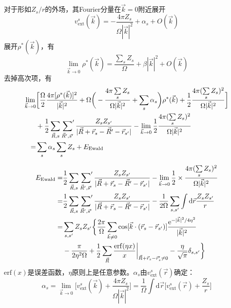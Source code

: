 对于形如$Z_s/r$的外场，其\textrm{Fourier}分量在$\vec k=0$附近展开
	\begin{equation}
		v_{\mathrm{ext}}^s(\vec k)=-\dfrac{4\pi Z_s}{\Omega|\vec k|^2}+\alpha_s+O(\vec k)
	\end{equation}
	展开$\rho^{\ast}(\vec k)$，有
	\begin{equation}
		\lim_{\vec k\rightarrow 0}\rho^{\ast}(\vec k)=\dfrac{\sum_sZ_s}{\Omega}+\beta|\vec k|^2+O(\vec k)
	\end{equation}
去掉高次项，有
\begin{equation}
	\begin{aligned}
		\lim_{\vec k\rightarrow 0}&\bigg[\dfrac{\Omega}2\dfrac{4\pi[\rho^{\ast}(\vec k)]^2}{|\vec k|^2}+\Omega\bigg(-\dfrac{4\pi\sum\limits_sZ_s}{\Omega|\vec k|^2}+\sum\limits_s\alpha_s\bigg)\rho^{\ast}(\vec k)+\dfrac12\dfrac{4\pi(\sum\limits_sZ_s)^2}{\Omega|\vec k|^2}\bigg]\\
		&+\dfrac12\sum_{\vec R,s}\sideset{}{^{\prime}}\sum_{\vec R^{\prime},\vec s^{\prime}}\dfrac{Z_sZ_{s^{\prime}}}{|\vec R+\vec r_s-\vec R^{\prime}-\vec r_{s^{\prime}}|}-\lim_{\vec k\rightarrow0}\dfrac12\dfrac{4\pi(\sum\limits_sZ_s)^2}{\Omega|\vec k|^2}\\
		=&\sum_s\alpha_s\sum_sZ_s+E_{\mathrm{Ewald}}
	\end{aligned}
\end{equation}

	\begin{equation}
		\begin{aligned}
			E_{\textrm{Ewald}}=&\dfrac12\sum_{\vec R,s}\sideset{}{^{\prime}}\sum_{\vec R^{\prime},\vec s^{\prime}}\dfrac{Z_sZ_{s^{\prime}}}{|\vec R+\vec r_s-\vec R^{\prime}-\vec r_{s^{\prime}}|}-\lim_{\vec k\rightarrow0}\dfrac12\times\dfrac{4\pi(\sum\limits_sZ_s)^2}{\Omega|\vec k|^2}\\
			=&\dfrac12\sum_{\vec R,s}\sideset{}{^{\prime}}\sum_{\vec R^{\prime},\vec s^{\prime}}\dfrac{Z_sZ_{s^{\prime}}}{|\vec R+\vec r_s-\vec R^{\prime}-\vec r_{s^{\prime}}|}-\dfrac1{2\Omega}\sum_{s,s^{\prime}}\int\mathrm{d}\vec r\dfrac{Z_sZ_{s^{\prime}}}r\\
			=&\sum_{s,s^{\prime}}Z_sZ_{s^{\prime}}\bigg\{\dfrac{2\pi}{\Omega}\sum_{\vec k\neq 0}\cos[\vec k\cdot(\vec r_s-\vec r_{s^{\prime}})]\dfrac{\mathrm{e}^{-|\vec k|^2/4\eta^2}}{|\vec k|^2}\\
			&-\dfrac{\pi}{2\eta^2\Omega}+\dfrac12\sum_{\vec R}\dfrac{\mathrm{erf}(\eta x)}x\bigg|_{\vec R+\vec r_s-\vec r_s^{\prime}\neq0}-\dfrac{\eta}{\sqrt{\pi}}\delta_{s,s^{\prime}}\bigg\}
		\end{aligned}
	\end{equation}
	$\mathrm{erf}(x)$是误差函数，$\eta$原则上是任意参数。$\alpha_s$由$v_{\mathrm{ext}}^s(\vec r)$确定：
	\begin{equation}
		\alpha_s=\lim_{\vec k\rightarrow0}\bigg[v_{\mathrm{ext}}^s(\vec k)+\dfrac{4\pi Z_s}{\Omega|\vec k|^2}\bigg]=\dfrac1{\Omega}\int\mathrm{d}\vec r\bigg[v_{\mathrm{ext}}^s(\vec r)+\dfrac{Z_s}r\bigg]
	\end{equation}


